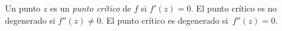\begin{definicion}
  Un punto $z$ es un \emph{punto crítico} de $f$ si $f'(z) = 0$. El punto
  crítico es no degenerado si $f''(z) \neq 0$. El punto crítico es degenerado
  si~$f''(z) = 0$.
\end{definicion}


%
